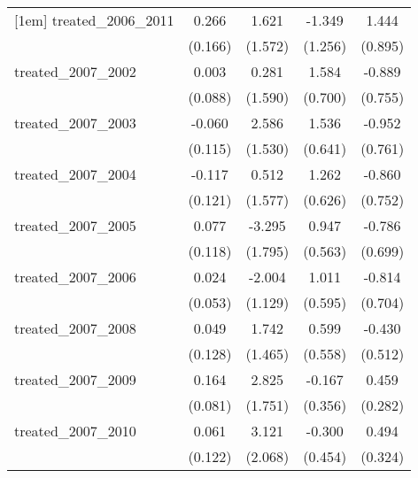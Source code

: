 {\begin{tabular}{l*{4}{c}}
[1em]
treated\_2006\_2011&       0.266         &       1.621         &      -1.349         &       1.444         \\
            &     (0.166)         &     (1.572)         &     (1.256)         &     (0.895)         \\
[1em]
treated\_2007\_2002&       0.003         &       0.281         &       1.584\sym{*}  &      -0.889         \\
            &     (0.088)         &     (1.590)         &     (0.700)         &     (0.755)         \\
[1em]
treated\_2007\_2003&      -0.060         &       2.586         &       1.536\sym{*}  &      -0.952         \\
            &     (0.115)         &     (1.530)         &     (0.641)         &     (0.761)         \\
[1em]
treated\_2007\_2004&      -0.117         &       0.512         &       1.262\sym{*}  &      -0.860         \\
            &     (0.121)         &     (1.577)         &     (0.626)         &     (0.752)         \\
[1em]
treated\_2007\_2005&       0.077         &      -3.295         &       0.947         &      -0.786         \\
            &     (0.118)         &     (1.795)         &     (0.563)         &     (0.699)         \\
[1em]
treated\_2007\_2006&       0.024         &      -2.004         &       1.011         &      -0.814         \\
            &     (0.053)         &     (1.129)         &     (0.595)         &     (0.704)         \\
[1em]
treated\_2007\_2008&       0.049         &       1.742         &       0.599         &      -0.430         \\
            &     (0.128)         &     (1.465)         &     (0.558)         &     (0.512)         \\
[1em]
treated\_2007\_2009&       0.164\sym{*}  &       2.825         &      -0.167         &       0.459         \\
            &     (0.081)         &     (1.751)         &     (0.356)         &     (0.282)         \\
[1em]
treated\_2007\_2010&       0.061         &       3.121         &      -0.300         &       0.494         \\
            &     (0.122)         &     (2.068)         &     (0.454)         &     (0.324)         \\

\end{tabular}}
